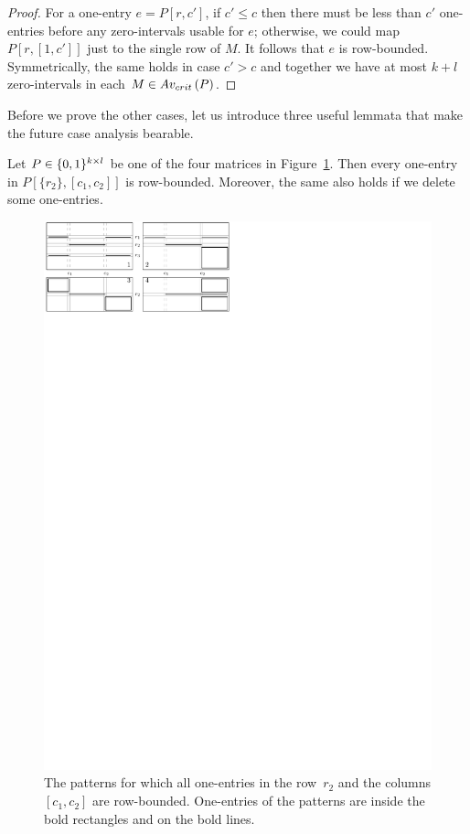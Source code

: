 \begin{proof}
For a one-entry $e=P[r,c']$, if $c'\leq c$ then there must be less than $c'$ one-entries before any zero-intervals usable for $e$; otherwise, we could map $P[r,[1,c']]$ just to the single row of $M$. It follows that $e$ is row-bounded. Symmetrically, the same holds in case $c'>c$ and together we have at most $k+l$ zero-intervals in each $M\in Av_{crit}\left(P\right)$.
\end{proof}

Before we prove the other cases, let us introduce three useful lemmata that make the future case analysis bearable.

\begin{lemma}
\label{lemma:H}
Let $P\in\{0,1\}^{k\times l}$ be one of the four matrices in Figure~\ref{fig:lemmaH}. Then every one-entry in $P[\{r_2\},[c_1,c_2]]$ is row-bounded. Moreover, the same also holds if we delete some one-entries.

\begin{figure}[!ht]
\centering
\includegraphics[width=\textwidth]{img/lemmaH.pdf}
\caption{The patterns for which all one-entries in the row~$r_2$ and the columns $[c_1,c_2]$ are row-bounded. One-entries of the patterns are inside the bold rectangles and on the bold lines.}
\label{fig:lemmaH}
\end{figure}
\end{lemma}
